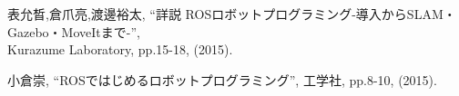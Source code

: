 \documentclass[11pt,a4j]{jarticle}
\begin{document}
\newpage




\begin{thebibliography}{9}
    表允晳,倉爪亮,渡邊裕太, ``詳説 ROSロボットプログラミング-導入からSLAM・Gazebo・MoveItまで-'', \\
    Kurazume Laboratory, pp.15-18, (2015).

    小倉崇, ``ROSではじめるロボットプログラミング'', 工学社, pp.8-10, (2015).

\end{thebibliography}
\end{document}
